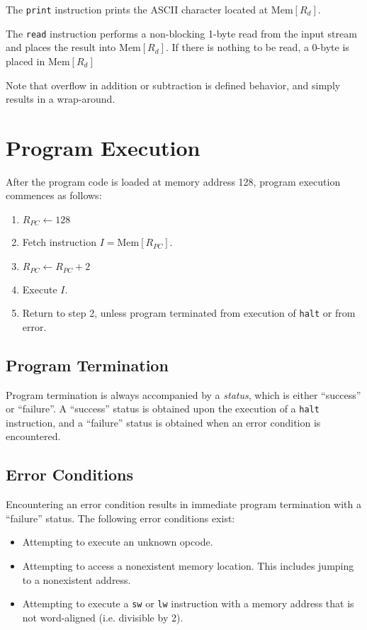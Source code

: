 \documentclass[12pt]{scrartcl}
\begin{document}
The \texttt{print} instruction prints the ASCII character located at $\mathrm{Mem}[R_d]$.

The \texttt{read} instruction performs a non-blocking 1-byte read from the input stream and places the result into $\mathrm{Mem}[R_d]$. If there is nothing to be read, a 0-byte is placed in $\mathrm{Mem}[R_d]$

Note that overflow in addition or subtraction is defined behavior, and simply results in a wrap-around.


\section{Program Execution}

After the program code is loaded at memory address 128, program execution commences as follows:

\begin{enumerate}
	\item $R_{PC} \gets 128$
	\item Fetch instruction $I = \mathrm{Mem}[R_{PC}]$.
	\item $R_{PC} \gets R_{PC} + 2$
	\item Execute $I$.
	\item Return to step 2, unless program terminated from execution of \texttt{halt} or from error.
\end{enumerate}

\subsection{Program Termination}
Program termination is always accompanied by a \textit{status}, which is either ``success'' or ``failure''. A ``success'' status is obtained upon the execution of a \texttt{halt} instruction, and a ``failure'' status is obtained when an error condition is encountered.

\subsection{Error Conditions}
Encountering an error condition results in immediate program termination with a ``failure'' status. The following error conditions exist:

\begin{itemize}
	\item Attempting to execute an unknown opcode.
	\item Attempting to access a nonexistent memory location. This includes jumping to a nonexistent address.
	\item Attempting to execute a \texttt{sw} or \texttt{lw} instruction with a memory address that is not word-aligned (i.e. divisible by 2).
\end{itemize}
\end{document}
